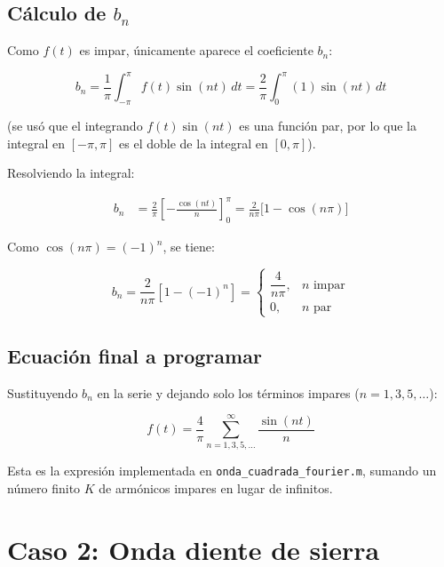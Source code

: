 \documentclass[11pt]{article}
\begin{document}
\subsection{Cálculo de $b_n$}

Como $f(t)$ es impar, únicamente aparece el coeficiente $b_n$:

\begin{equation}
b_n = \frac{1}{\pi} \int_{-\pi}^{\pi} f(t) \sin(nt)\, dt
    = \frac{2}{\pi} \int_{0}^{\pi} (1)\sin(nt)\, dt
\end{equation}

(se usó que el integrando $f(t)\sin(nt)$ es una función par, por
lo que la integral en $[-\pi,\pi]$ es el doble de la integral en
$[0,\pi]$).

Resolviendo la integral:

\begin{align}
b_n &= \frac{2}{\pi} \left[ -\frac{\cos(nt)}{n} \right]_0^{\pi}
     = \frac{2}{n\pi} \Big[ 1 - \cos(n\pi) \Big]
\end{align}

Como $\cos(n\pi) = (-1)^n$, se tiene:

\begin{equation}
b_n = \frac{2}{n\pi}\left[1 - (-1)^n\right] =
\begin{cases}
\dfrac{4}{n\pi}, & n \text{ impar} \\[2mm]
0, & n \text{ par}
\end{cases}
\end{equation}

\subsection{Ecuación final a programar}

Sustituyendo $b_n$ en la serie y dejando solo los términos impares
($n = 1, 3, 5, \ldots$):

\begin{equation}
\boxed{\;f(t) = \frac{4}{\pi} \sum_{n=1,3,5,\ldots}^{\infty} \frac{\sin(nt)}{n}\;}
\end{equation}

Esta es la expresión implementada en \texttt{onda\_cuadrada\_fourier.m},
sumando un número finito $K$ de armónicos impares en lugar de
infinitos.

\section{Caso 2: Onda diente de sierra}
\end{document}
